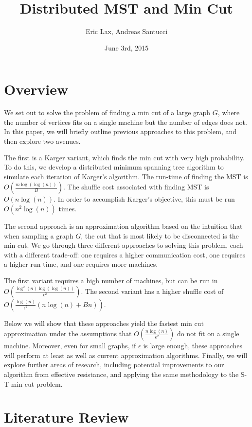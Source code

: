 \documentclass[12pt]{article}
\begin{document}
 

\title{\textbf{Distributed MST and Min Cut}}
\author{Eric Lax, Andreas Santucci}
\date{June 3rd, 2015}
\maketitle

\section{Overview}

We set out to solve the problem of finding a min cut of a large graph $G$, where the number of vertices fits on a single machine but the number of edges does not. In this paper, we will briefly outline previous approaches to this problem, and then explore two avenues. 

The first is a Karger variant, which finds the min cut with very high probability. To do this, we develop a distributed minimum spanning tree algorithm to simulate each iteration of Karger's algorithm. The run-time of finding the MST is $O(\frac{m \log(\log(n))}{B})$. The shuffle cost associated with finding MST is $O(n \log(n))$. In order to accomplish Karger's objective, this must be run $O(n^2 \log(n))$ times. 

The second approach is an approximation algorithm based on the intuition that when sampling a graph $G$, the cut that is most likely to be disconnected is the min cut. We go through three different approaches to solving this problem, each with a different trade-off: one requires a higher communication cost, one requires a higher run-time, and one requires more machines.

The first variant requires a high number of machines, but can be run in $O(\frac{\log^2(n)\log(\log(n))}{\epsilon^2})$. The second variant has a higher shuffle cost of $O(\frac{\log(n)}{\epsilon^2}(n \log(n) + Bn))$.

Below we will show that these approaches yield the fastest min cut approximation under the assumptions that $O(\frac{n\log(n)}{\epsilon^2})$ do not fit on a single machine. Moreover, even for small graphs, if $\epsilon$ is large enough, these approaches will perform at least as well as current approximation algorithms. Finally, we will explore further areas of research, including potential improvements to our algorithm from effective resistance, and applying the same methodology to the S-T min cut problem.

\section{Literature Review}
\end{document}
